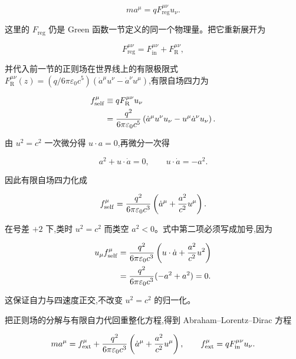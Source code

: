 \begin{equation*}
 ma^\mu=qF_{\mathrm{reg}}^{\mu\nu}u_\nu.
\end{equation*}

这里的 $F_{\mathrm{reg}}$ 仍是 Green 函数一节定义的同一个物理量。把它重新展开为

\begin{equation*}
 F_{\mathrm{reg}}^{\mu\nu}
 =F_{\mathrm{in}}^{\mu\nu}+F_{\mathrm R}^{\mu\nu},
\end{equation*}

并代入前一节的正则场在世界线上的有限极限式 $F_{\mathrm R}^{\mu\nu}(z)=(q/6\pi\varepsilon_0c^5)(\dot a^\mu u^\nu-\dot a^\nu u^\mu)$,有限自场四力为

\begin{align*}
 f_{\mathrm{self}}^\mu
 &\equiv qF_{\mathrm R}^{\mu\nu}u_\nu\\
 &={q^2\over6\pi\varepsilon_0c^5}
 \left(
 \dot a^\mu u^\nu u_\nu
 -u^\mu\dot a^\nu u_\nu
 \right).
\end{align*}

由 $u^2=c^2$ 一次微分得 $u\cdot a=0$,再微分一次得

\begin{equation*}
 a^2+u\cdot\dot a=0,
 \qquad
 u\cdot\dot a=-a^2.
\end{equation*}

因此有限自场四力化成

\begin{equation*}
 f_{\mathrm{self}}^\mu
 ={q^2\over6\pi\varepsilon_0c^3}
 \left(
 \dot a^\mu+{a^2\over c^2}u^\mu
 \right).
\end{equation*}

在号差 $+2$ 下,类时 $u^2=c^2$ 而类空 $a^2<0$。式中第二项必须写成加号,因为

\begin{align*}
 u_\mu f_{\mathrm{self}}^\mu
 &={q^2\over6\pi\varepsilon_0c^3}
 \left(u\cdot\dot a+{a^2\over c^2}u^2\right)\\
 &={q^2\over6\pi\varepsilon_0c^3}(-a^2+a^2)=0.
\end{align*}

这保证自力与四速度正交,不改变 $u^2=c^2$ 的归一化。

把正则场的分解与有限自力代回重整化方程,得到 Abraham--Lorentz--Dirac 方程

\begin{equation*}
 ma^\mu
 =f_{\mathrm{ext}}^\mu
 +{q^2\over6\pi\varepsilon_0c^3}
 \left(
 \dot a^\mu+{a^2\over c^2}u^\mu
 \right),
 \qquad
 f_{\mathrm{ext}}^\mu=qF_{\mathrm{in}}^{\mu\nu}u_\nu.
\end{equation*}

